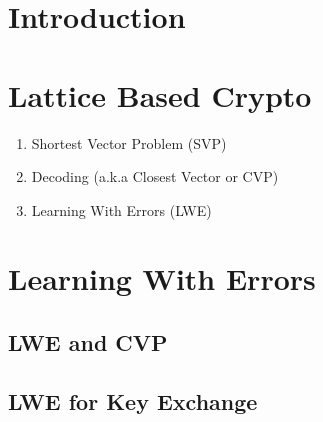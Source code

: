 \documentclass{scribe}
\begin{document}
\maketitle

\section{Introduction}
\section{Lattice Based Crypto}
\begin{enumerate}
    \item Shortest Vector Problem (SVP)
    \item Decoding (a.k.a Closest Vector or CVP)
    \item Learning With Errors (LWE)
\end{enumerate}
\section{Learning With Errors}
\subsection{LWE and CVP}
\subsection{LWE for Key Exchange}






%

\end{document}
